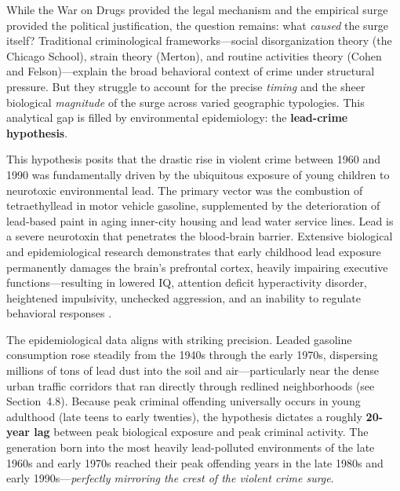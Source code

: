 \documentclass[12pt,openany]{book}
\begin{document}
While the War on Drugs provided the legal mechanism and the empirical surge provided the political justification, the question remains: what \textit{caused} the surge itself? Traditional criminological frameworks---social disorganization theory (the Chicago School), strain theory (Merton), and routine activities theory (Cohen and Felson)---explain the broad behavioral context of crime under structural pressure. But they struggle to account for the precise \textit{timing} and the sheer biological \textit{magnitude} of the surge across varied geographic typologies. This analytical gap is filled by environmental epidemiology: the \textbf{lead-crime hypothesis}.

This hypothesis posits that the drastic rise in violent crime between 1960 and 1990 was fundamentally driven by the ubiquitous exposure of young children to neurotoxic environmental lead. The primary vector was the combustion of tetraethyllead in motor vehicle gasoline, supplemented by the deterioration of lead-based paint in aging inner-city housing and lead water service lines. Lead is a severe neurotoxin that penetrates the blood-brain barrier. Extensive biological and epidemiological research demonstrates that early childhood lead exposure permanently damages the brain's prefrontal cortex, heavily impairing executive functions---resulting in lowered IQ, attention deficit hyperactivity disorder, heightened impulsivity, unchecked aggression, and an inability to regulate behavioral responses \cite{reyes2007, nevin2007}.

The epidemiological data aligns with striking precision. Leaded gasoline consumption rose steadily from the 1940s through the early 1970s, dispersing millions of tons of lead dust into the soil and air---particularly near the dense urban traffic corridors that ran directly through redlined neighborhoods (see Section~4.8). Because peak criminal offending universally occurs in young adulthood (late teens to early twenties), the hypothesis dictates a roughly \textbf{20-year lag} between peak biological exposure and peak criminal activity. The generation born into the most heavily lead-polluted environments of the late 1960s and early 1970s reached their peak offending years in the late 1980s and early 1990s---\textit{perfectly mirroring the crest of the violent crime surge}.
\end{document}
